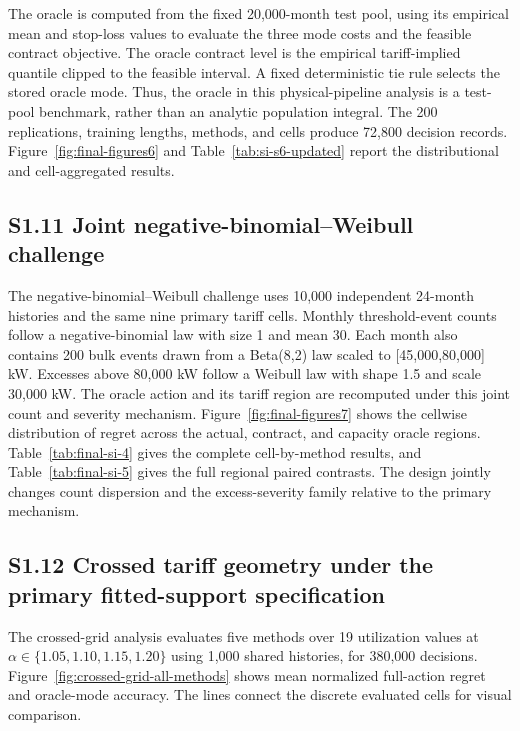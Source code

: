 \documentclass[]{interact}
\begin{document}
The oracle is computed from the fixed 20,000-month test pool, using its
empirical mean and stop-loss values to evaluate the three mode costs
and the feasible contract objective. The oracle contract level is the
empirical tariff-implied quantile clipped to the feasible interval.
A fixed deterministic tie rule selects the stored oracle mode. Thus,
the oracle in this physical-pipeline analysis is a test-pool benchmark,
rather than an analytic population integral. The 200 replications,
training lengths, methods, and cells produce 72,800 decision records.
Figure~\ref{fig:final-figures6} and
Table~\ref{tab:si-s6-updated} report the distributional and
cell-aggregated results.

\subsection*{S1.11 Joint negative-binomial--Weibull challenge}

The negative-binomial--Weibull challenge uses 10,000 independent
24-month histories and the same nine primary tariff cells. Monthly
threshold-event counts follow a negative-binomial law with size 1 and
mean 30. Each month also contains 200 bulk events drawn from a
Beta(8,2) law scaled to [45,000,80,000] kW. Excesses above 80,000 kW
follow a Weibull law with shape 1.5 and scale 30,000 kW. The oracle
action and its tariff region are recomputed under this joint count
and severity mechanism. Figure~\ref{fig:final-figures7} shows the
cellwise distribution of regret across the actual, contract, and
capacity oracle regions. Table~\ref{tab:final-si-4} gives the complete
cell-by-method results, and Table~\ref{tab:final-si-5} gives the full
regional paired contrasts. The design jointly changes count dispersion and
the excess-severity family relative to the primary mechanism.


\subsection*{S1.12 Crossed tariff geometry under the primary fitted-support specification}

The crossed-grid analysis evaluates five methods over 19 utilization
values at $\alpha\in\{1.05,1.10,1.15,1.20\}$ using 1,000 shared
histories, for 380,000 decisions. Figure~\ref{fig:crossed-grid-all-methods}
shows mean normalized full-action regret and oracle-mode accuracy. The
lines connect the discrete evaluated cells for visual comparison.
\end{document}
